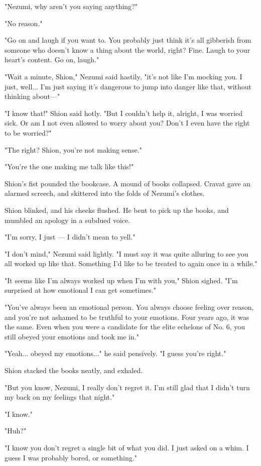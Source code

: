 "Nezumi, why aren't you saying anything?"

"No reason."

"Go on and laugh if you want to. You probably just think it's all
gibberish from someone who doesn't know a thing about the world, right?
Fine. Laugh to your heart's content. Go on, laugh."

"Wait a minute, Shion," Nezumi said hastily, "it's not like I'm mocking
you. I just, well... I'm just saying it's dangerous to jump into danger
like that, without thinking about---"

"I know that!" Shion said hotly. "But I couldn't help it, alright, I was
worried sick. Or am I not even allowed to worry about you? Don't I even
have the right to be worried?"

"The right? Shion, you're not making sense."

"You're the one making me talk like this!"

Shion's fist pounded the bookcase. A mound of books collapsed. Cravat
gave an alarmed screech, and skittered into the folds of Nezumi's
clothes.

Shion blinked, and his cheeks flushed. He bent to pick up the books, and
mumbled an apology in a subdued voice.

"I'm sorry, I just --- I didn't mean to yell."

"I don't mind," Nezumi said lightly. "I must say it was quite alluring
to see you all worked up like that. Something I'd like to be treated to
again once in a while."

"It seems like I'm always worked up when I'm with you," Shion sighed.
"I'm surprised at how emotional I can get sometimes."

"You've always been an emotional person. You always choose feeling over
reason, and you're not ashamed to be truthful to your emotions. Four
years ago, it was the same. Even when you were a candidate for the elite
echelons of No. 6, you still obeyed your emotions and took me in."

"Yeah... obeyed my emotions..." he said pensively. "I guess you're
right."

Shion stacked the books neatly, and exhaled.

"But you know, Nezumi, I really don't regret it. I'm still glad that I
didn't turn my back on my feelings that night."

"I know."

"Huh?"

"I know you don't regret a single bit of what you did. I just asked on a
whim. I guess I was probably bored, or something."

